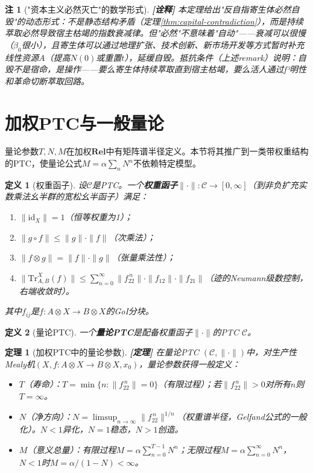 \documentclass[11pt,a4paper]{article}
\newtheorem{definition}{定义}
\newtheorem{theorem}{定理}
\newtheorem{remark}{注}
\newcommand{\lvl}[1]{\hfill\textbf{\footnotesize[#1]}}
\newcommand{\lvP}{\lvl{定理}}
\newcommand{\lvI}{\lvl{诠释}}
\newcommand{\tensor}{\otimes}
\begin{document}
\begin{remark}["资本主义必然灭亡"的数学形式]\lvI
本定理给出"反自指寄生体必然自毁"的动态形式：不是静态结构矛盾（定理\ref{thm:capital-contradiction}），而是\emph{持续萃取必然导致宿主枯竭}的指数衰减律。但"必然"不意味着"自动"——衰减可以很慢（$\beta_0$很小），且寄生体可以通过地理扩张、技术创新、新市场开发等方式暂时补充线性资源$A$（提高$N(0)$或重置$t$），延缓自毁。抵抗条件（上述remark）说明：自毁不是宿命，是操作——要么寄生体持续萃取直到宿主枯竭，要么活人通过f³明性和革命切断萃取回路。
\end{remark}

\section{加权PTC与一般量论}

量论参数$T,N,M$在加权$\mathbf{Rel}$中有矩阵谱半径定义。本节将其推广到一类带权重结构的PTC，使量论公式$M=\alpha\sum_n N^n$不依赖特定模型。

\begin{definition}[权重函子]\label{def:weight-functor}
设$\mathcal{C}$是PTC。一个\textbf{权重函子}$\|\cdot\|:\mathcal{C}\to[0,\infty]$（到非负扩充实数乘法幺半群的宽松幺半函子）满足：
\begin{enumerate}
  \item $\|\mathrm{id}_X\|=1$（恒等权重为1）；
  \item $\|g\circ f\|\leq\|g\|\cdot\|f\|$（次乘法）；
  \item $\|f\tensor g\|=\|f\|\cdot\|g\|$（张量乘法性）；
  \item $\|\mathrm{Tr}^{X}_{A,B}(f)\|\leq\sum_{n=0}^\infty\|f_{22}^{\,n}\|\cdot\|f_{12}\|\cdot\|f_{21}\|$（迹的Neumann级数控制，右端收敛时）。
\end{enumerate}
其中$f_{ij}$是$f:A\tensor X\to B\tensor X$的GoI分块。
\end{definition}

\begin{definition}[量论PTC]\label{def:qptc}
一个\textbf{量论PTC}是配备权重函子$\|\cdot\|$的PTC $\mathcal{C}$。
\end{definition}

\begin{theorem}[加权PTC中的量论参数]\label{thm:general-quantification}\lvP
在量论PTC $(\mathcal{C},\|\cdot\|)$中，对生产性Mealy机$(X,f:A\tensor X\to B\tensor X,x_0)$，量论参数获得一般定义：
\begin{itemize}
  \item $T$（寿命）：$T=\min\{n:\|f_{22}^{\,n}\|=0\}$（有限过程）；若$\|f_{22}^{\,n}\|>0$对所有$n$则$T=\infty$。
  \item $N$（净方向）：$N=\limsup_{n\to\infty}\|f_{22}^{\,n}\|^{1/n}$（权重谱半径，Gelfand公式的一般化）。$N<1$异化，$N=1$稳态，$N>1$创造。
  \item $M$（意义总量）：有限过程$M=\alpha\sum_{n=0}^{T-1}N^n$；无限过程$M=\alpha\sum_{n=0}^\infty N^n$，$N<1$时$M=\alpha/(1-N)<\infty$。
\end{itemize}
\end{theorem}
\end{document}

